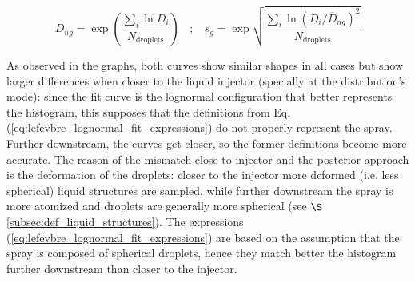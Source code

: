 %
\begin{equation}
\label{eq:lefevbre_lognormal_fit_expressions}
\overline{D}_{ng} = \exp \left(  \frac{\sum_i \ln D_i }{N_\mathrm{droplets}} \right)  ~~~~ ; ~~~~ 
s_g = \exp \sqrt{  \frac{\sum_i \ln \left( D_i / \overline{D}_{ng} \right) ^2 }{N_\mathrm{droplets}} }
\end{equation}

As observed in the graphs, both curves show similar shapes in all cases but show larger differences when closer to the liquid injector (specially at the distribution's mode): since the fit curve is the lognormal configuration that better represents the histogram, this supposes that the definitions from Eq. (\ref{eq:lefevbre_lognormal_fit_expressions}) do not properly represent the spray. Further downstream, the curves get closer, so the former definitions become more accurate. The reason of the mismatch close to injector and the posterior approach is the deformation of the droplets: closer to the injector more deformed (i.e. less spherical) liquid structures are sampled, while further downstream the spray is more atomized and droplets are generally more spherical
(see $\S$ \ref{subsec:def_liquid_structures}). The expressions (\ref{eq:lefevbre_lognormal_fit_expressions}) are based on the assumption that the spray is composed of spherical droplets, hence they match better the histogram further downstream than closer to the injector.

\clearpage


